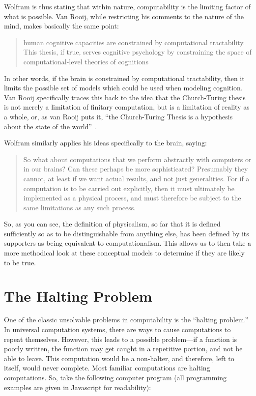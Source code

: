 Wolfram is thus stating that within nature, computability is the limiting factor of what is possible.  Van Rooij, while restricting his comments to the nature of the mind, makes basically the same point:

\begin{quote}
human cognitive capacities are constrained by computational tractability.  This thesis, if true, serves cognitive psychology by constraining the space of computational-level theories of cognitions \citep{vanrooij2008}
\end{quote}

In other words, if the brain is constrained by computational tractability, then it limits the possible set of models which could be used when modeling cognition.  Van Rooij specifically traces this back to the idea that the Church-Turing thesis is not merely a limitation of finitary computation, but is a limitation of reality as a whole, or, as van Rooij puts it, ``the Church-Turing Thesis is a hypothesis about the state of the world'' \citep{vanrooij2008}.

Wolfram similarly applies his ideas specifically to the brain, saying:

\begin{quote}
So what about computations that we perform abstractly with computers or in our brains?  Can these perhaps be more sophisticated?  Presumably they cannot, at least if we want  actual results, and not just generalities.  For if a computation is to be carried out explicitly, then it must ultimately be implemented as a physical process, and must therefore be subject to the same limitations as any such process. \citep[][pg. 721]{wolfram2002}
\end{quote}

So, as you can see, the definition of physicalism, so far that it is defined sufficiently so as to be distinguishable from anything else, has been defined by its supporters as being equivalent to computationalism.  This allows us to then take a more methodical look at these conceptual models to determine if they are likely to be true.

\section{The Halting Problem}

One of the classic unsolvable problems in computability is the ``halting problem.''  In universal computation systems, there are ways to cause computations to repeat themselves.  However, this leads to a possible problem---if a function is poorly written, the function may get caught in a repetitive portion, and not be able to leave.  This computation would be a non-halter, and therefore, left to itself, would never complete.  Most familiar computations are halting computations.  So, take the following computer program (all programming examples are given in Javascript for readability):

